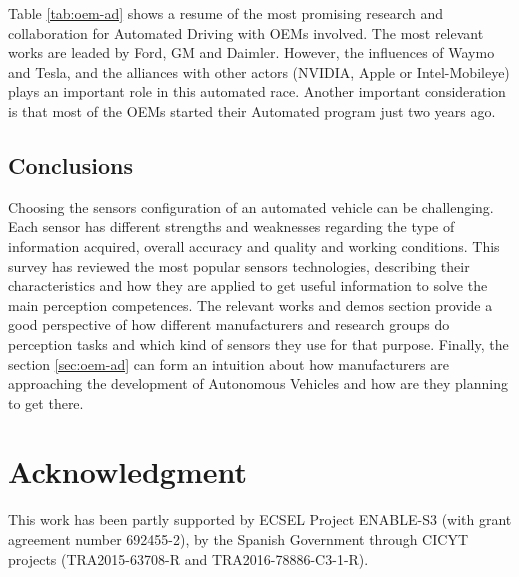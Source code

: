 \documentclass[journal]{IEEEtran}
\begin{document}
Table \ref{tab:oem-ad} shows a resume of the most promising research and 
collaboration for Automated Driving with OEMs involved. The most relevant works 
are leaded by Ford, GM and Daimler. However, the influences of Waymo and Tesla, 
and the alliances with other actors (NVIDIA, Apple or Intel-Mobileye) plays an
important role in this automated race. Another important consideration is that 
most of the OEMs started their Automated program just two years ago.

\subsection{Conclusions}

Choosing the sensors configuration of an automated vehicle can be challenging.
Each sensor has different strengths and weaknesses regarding
the type of information acquired, overall accuracy and quality and working conditions. 
This survey has reviewed the most popular sensors technologies, 
describing their characteristics and how they are applied to get useful information 
to solve the main perception competences.
The relevant works and demos section provide a good perspective of how different 
manufacturers and research groups do perception tasks and which kind of sensors 
they use for that purpose. 
Finally, the section \ref{sec:oem-ad} can form an intuition about how
manufacturers are approaching the development of Autonomous Vehicles
and how are they planning to get there.


\section*{Acknowledgment}

This work has been partly supported by ECSEL Project ENABLE-S3 
(with grant agreement number 692455-2), by the Spanish Government through
CICYT projects (TRA2015-63708-R and TRA2016-78886-C3-1-R).





\end{document}
